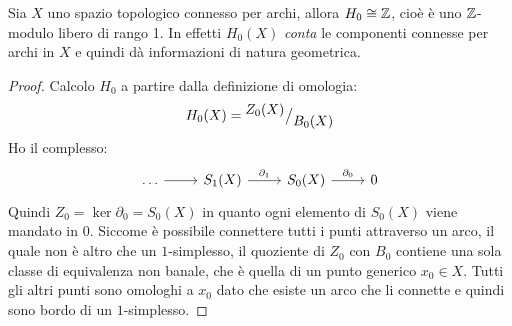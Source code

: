 \begin{proposition}
  Sia $ X $ uno spazio topologico connesso per archi, allora $ H_0 \cong \mathbb{Z} $, cioè è uno $ \mathbb{Z} $-modulo libero di rango 1.
  In effetti $ H_0(X) $ \emph{conta} le componenti connesse per archi in $ X $ e quindi dà informazioni di natura geometrica.
\end{proposition}
\begin{proof}
  Calcolo $ H_0 $ a partire dalla definizione di omologia:
  \[
    H_0(X) = {^{\textstyle Z_0(X)}\big/_{\textstyle B_0(X)}}
  \]
  Ho il complesso:
  \[
    \begin{tikzcd}
      \dots \arrow{r}{} & S_1(X) \arrow{r}{\partial_1} & S_0(X) \arrow{r}{\partial_0}  & 0
    \end{tikzcd}
  \]
  Quindi $ Z_0 = \ker{\partial_0} = S_0(X) $ in quanto ogni elemento di
  $ S_0(X) $ viene mandato in $ 0 $. Siccome è possibile connettere tutti i
  punti attraverso un arco, il quale non è altro che un $ 1 $-simplesso, il
  quoziente di $ Z_0 $ con $ B_0 $ contiene una sola classe di equivalenza non
  banale, che è quella di un punto generico $ x_0 \in X $. Tutti gli altri punti
  sono omologhi a $ x_0 $ dato che esiste un arco che li connette e quindi
  sono bordo di un $ 1 $-simplesso.




\end{proof}
